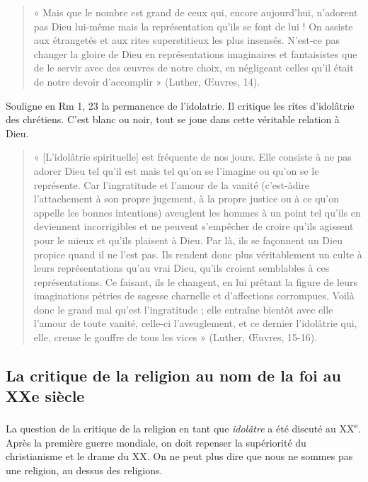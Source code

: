 \begin{quote}
«  Mais  que  le  nombre  est  grand  de  ceux  qui,  encore  aujourd’hui,  n’adorent  pas  Dieu  lui-même  mais  la représentation  qu’ils  se  font  de  lui  !  On  assiste  aux  étrangetés  et  aux  rites  superstitieux  les  plus insensés.  N’est-ce  pas  changer  la  gloire  de  Dieu  en  représentations  imaginaires  et  fantaisistes  que  de  le servir  avec  des  œuvres  de  notre  choix,  en  négligeant  celles  qu’il  était  de  notre  devoir  d’accomplir  » (Luther,  Œuvres,  14).
\end{quote}
Souligne en Rm 1, 23 la permanence de l’idolatrie. Il critique les rites d’idolâtrie des chrétiens. C’est blanc ou noir, tout se joue dans cette véritable relation à Dieu. 
\begin{quote}
    «  [L’idolâtrie  spirituelle]  est  fréquente  de  nos  jours.  Elle  consiste  à  ne  pas  adorer  Dieu  tel  qu’il  est mais  tel  qu’on  se  l’imagine  ou  qu’on  se  le  représente.  Car  l’ingratitude  et  l’amour  de  la  vanité  (c’est-àdire  l’attachement  à  son  propre  jugement,  à  la  propre  justice  ou  à  ce  qu’on  appelle  les  bonnes intentions)  aveuglent  les  hommes  à  un  point  tel  qu’ils  en  deviennent  incorrigibles  et  ne  peuvent s’empêcher  de  croire  qu’ils  agissent  pour  le  mieux  et  qu’ils  plaisent  à  Dieu.  Par  là,  ils  se  façonnent  un Dieu  propice  quand  il  ne  l’est  pas.  Ils  rendent  donc  plus  véritablement  un  culte  à  leurs  représentations qu’au  vrai  Dieu,  qu’ils  croient  semblables  à  ces  représentations.  Ce  faisant,  ils  le  changent,  en  lui  prêtant  la  figure  de  leurs  imaginations  pétries  de  sagesse  charnelle  et  d’affections  corrompues.  Voilà donc  le  grand  mal  qu’est  l’ingratitude  ;  elle  entraîne  bientôt  avec  elle  l’amour  de  toute  vanité,  celle-ci l’aveuglement,  et  ce  dernier  l’idolâtrie  qui,  elle,  creuse  le  gouffre  de  tous  les  vices  »  (Luther,  Œuvres, 15-16).
\end{quote}



\subsection{La critique de la religion au nom de la foi au XXe siècle}

La question de la critique de la religion en tant que \textit{idolâtre} a été discuté au XX\textsuperscript{e}. Après la première guerre mondiale, on doit repenser la supériorité du christianisme et le drame du XX. On ne peut plus dire que nous ne sommes pas une religion, au dessus des religions. 


